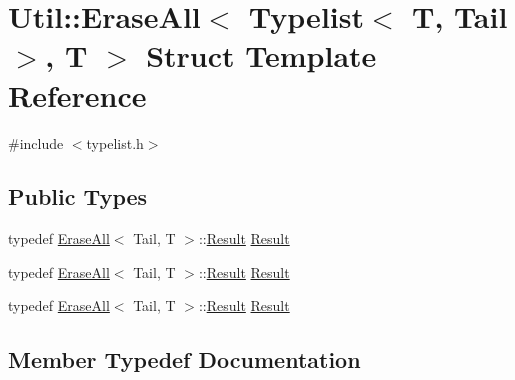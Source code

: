 \hypertarget{structUtil_1_1TL_1_1EraseAll_3_01Typelist_3_01T_00_01Tail_01_4_00_01T_01_4}{}\section{Util\+:\+:Erase\+All$<$ Typelist$<$ T, Tail $>$, T $>$ Struct Template Reference}
\label{structUtil_1_1TL_1_1EraseAll_3_01Typelist_3_01T_00_01Tail_01_4_00_01T_01_4}


{\ttfamily \#include $<$typelist.\+h$>$}

\subsection*{Public Types}
\begin{DoxyCompactItemize}
\item 
typedef \mbox{\hyperlink{structUtil_1_1TL_1_1EraseAll}{Erase\+All}}$<$ Tail, T $>$\+::\mbox{\hyperlink{structUtil_1_1TL_1_1EraseAll_3_01Typelist_3_01T_00_01Tail_01_4_00_01T_01_4_a19df041eef8d861bbb0369642bbd5378}{Result}} \mbox{\hyperlink{structUtil_1_1TL_1_1EraseAll_3_01Typelist_3_01T_00_01Tail_01_4_00_01T_01_4_a19df041eef8d861bbb0369642bbd5378}{Result}}
\item 
typedef \mbox{\hyperlink{structUtil_1_1TL_1_1EraseAll}{Erase\+All}}$<$ Tail, T $>$\+::\mbox{\hyperlink{structUtil_1_1TL_1_1EraseAll_3_01Typelist_3_01T_00_01Tail_01_4_00_01T_01_4_a19df041eef8d861bbb0369642bbd5378}{Result}} \mbox{\hyperlink{structUtil_1_1TL_1_1EraseAll_3_01Typelist_3_01T_00_01Tail_01_4_00_01T_01_4_a19df041eef8d861bbb0369642bbd5378}{Result}}
\item 
typedef \mbox{\hyperlink{structUtil_1_1TL_1_1EraseAll}{Erase\+All}}$<$ Tail, T $>$\+::\mbox{\hyperlink{structUtil_1_1TL_1_1EraseAll_3_01Typelist_3_01T_00_01Tail_01_4_00_01T_01_4_a19df041eef8d861bbb0369642bbd5378}{Result}} \mbox{\hyperlink{structUtil_1_1TL_1_1EraseAll_3_01Typelist_3_01T_00_01Tail_01_4_00_01T_01_4_a19df041eef8d861bbb0369642bbd5378}{Result}}
\end{DoxyCompactItemize}


\subsection{Member Typedef Documentation}
\mbox{\label{structUtil_1_1TL_1_1EraseAll_3_01Typelist_3_01T_00_01Tail_01_4_00_01T_01_4_a19df041eef8d861bbb0369642bbd5378}} 
